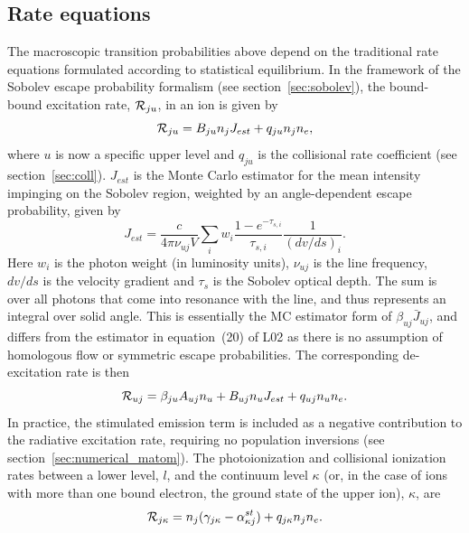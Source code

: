 \subsection{Rate equations}
\label{sec:rate_eq}
The macroscopic transition probabilities above depend on the traditional
rate equations formulated according to statistical equilibrium. 
In the framework of the Sobolev escape probability formalism 
(see section~\ref{sec:sobolev}), 
the bound-bound excitation rate, ${\cal R}_{ju}$, in an ion is given by 
\begin{equation}
{\cal R}_{ju} = B_{ju} n_j J_{est} + q_{ju} n_j n_e,
\label{eq:rad_rate}
\end{equation}
where $u$ is now a specific upper level and $q_{ju}$ is the collisional
rate coefficient (see section~\ref{sec:coll}).
$J_{est}$ is the Monte Carlo estimator for the mean intensity 
impinging on the Sobolev region, weighted by an angle-dependent escape probability, 
given by \citep{sim2004}
\begin{equation}
J_{est} = \frac{c}{4 \pi \nu_{uj} V} \sum_{i} w_i \frac{1 - e^{-\tau_{s,i}}}{\tau_{s,i}} \frac{1}{(dv/ds)_i}.
\end{equation}
Here $w_i$ is the photon weight (in luminosity units), $\nu_{uj}$
is the line frequency, $dv/ds$ is the velocity gradient and
$\tau_s$ is the Sobolev optical depth.
The sum is over all photons that come into resonance with the line,
and thus represents an integral over solid angle.
This is essentially the MC estimator form of $\beta_{uj}\bar{J}_{uj}$, and differs
from the estimator in equation~(20) of L02 as 
there is no assumption of homologous flow or symmetric escape probabilities.
The corresponding de-excitation rate is then 
\begin{equation}
{\cal R}_{uj} = \beta_{ju} A_{uj} n_u + B_{uj} n_u J_{est} +
q_{uj} n_u n_e.
\label{eq:nlte_rul}
\end{equation}
In practice, the stimulated emission term is included as a negative contribution
to the radiative excitation rate, requiring no population inversions 
(see section~\ref{sec:numerical_matom}).
The photoionization and collisional ionization rates
between a lower level, $l$, and the continuum level $\kappa$ 
(or, in the case of ions with more than one bound electron, 
the ground state of the upper ion),
$\kappa$, are
\begin{equation}
{\cal R}_{j \kappa}= n_j (\gamma_{j\kappa} - \alpha^{st}_{\kappa j})  + q_{j \kappa} n_j n_e.
\end{equation}
